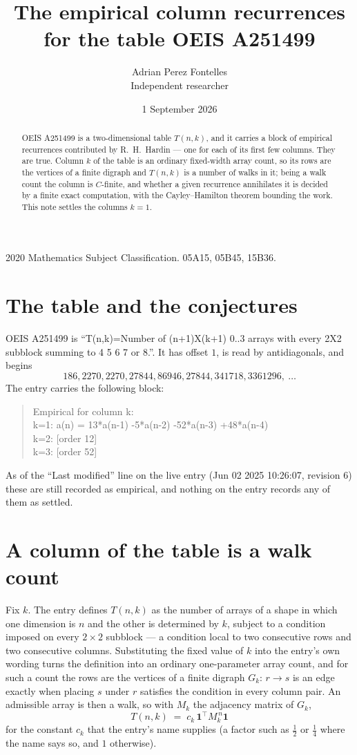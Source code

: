 \documentclass[11pt,a4paper]{article}
\title{The empirical column recurrences for the table OEIS A251499}
\author{Adrian Perez Fontelles\\ \small Independent researcher}
\date{1 September 2026}
\theoremstyle{plain}
\theoremstyle{definition}
\begin{document}
\maketitle

\begin{abstract}
OEIS A251499 is a two-dimensional table $T(n,k)$, and it carries a block of empirical
recurrences contributed by R.~H.~Hardin --- one for each of its first few columns. They are
true. Column $k$ of the table is an ordinary fixed-width array count, so its rows are the
vertices of a finite digraph and $T(n,k)$ is a number of walks in it; being a walk count the
column is $C$-finite, and whether a given recurrence annihilates it is decided by a finite
exact computation, with the Cayley--Hamilton theorem bounding the work. This note settles the
columns $k=1$.
\end{abstract}

\noindent\small 2020 Mathematics Subject Classification. 05A15, 05B45, 15B36.\normalsize

\section{The table and the conjectures}

OEIS A251499 is ``T(n,k)=Number of (n+1)X(k+1) 0..3 arrays with every 2X2 subblock summing to 4 5 6 7 or 8.''. It has offset $1$, is
read by antidiagonals, and begins
\[
186, 2270, 2270, 27844, 86946, 27844, 341718, 3361296,\ \dots
\]
The entry carries the following block:
\begin{quote}\small
Empirical for column k:\\
k=1: a(n) = 13*a(n-1) -5*a(n-2) -52*a(n-3) +48*a(n-4)\\
k=2: [order 12]\\
k=3: [order 52]\\
\end{quote}
As of the ``Last modified'' line on the live entry (Jun 02 2025 10:26:07, revision 6) these are still
recorded as empirical, and nothing on the entry records any of them as settled.

\section{A column of the table is a walk count}

Fix $k$. The entry defines $T(n,k)$ as the number of arrays of a shape in which one dimension
is $n$ and the other is determined by $k$, subject to a condition imposed on every
$2\times2$ subblock --- a condition local to two consecutive rows and two consecutive columns.
Substituting the fixed value of $k$ into the entry's own wording turns the definition into an
ordinary one-parameter array count, and for such a count the rows are the vertices of a finite
digraph $G_k$: $r\to s$ is an edge exactly when placing $s$ under $r$ satisfies the condition
in every column pair. An admissible array is then a walk, so with $M_k$ the adjacency matrix
of $G_k$,
\[
T(n,k)\;=\;c_k\,\mathbf{1}^{\!\top}M_k^{\,n}\mathbf{1}
\]
for the constant $c_k$ that the entry's name supplies (a factor such as $\tfrac12$ or
$\tfrac14$ where the name says so, and $1$ otherwise).
\end{document}

